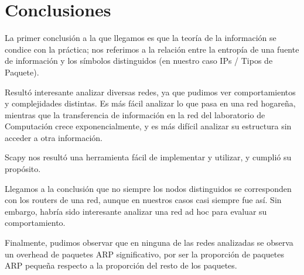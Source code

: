 \section{Conclusiones}

La primer conclusión a la que llegamos es que la teoría de la información se condice con la práctica; nos referimos a la relación entre la entropía de una fuente de información y los símbolos distinguidos (en nuestro caso IPs / Tipos de Paquete).

Resultó interesante analizar diversas redes, ya que pudimos ver comportamientos y complejidades distintas. Es más fácil analizar lo que pasa en una red hogareña, mientras que la transferencia de información en la red del laboratorio de Computación crece exponencialmente, y es más difícil analizar su estructura sin acceder a otra información.

Scapy nos resultó una herramienta fácil de implementar y utilizar, y cumplió su propósito.

Llegamos a la conclusión que no siempre los nodos distinguidos se corresponden con los routers de una red, aunque en nuestros casos casi siempre fue así. Sin embargo, habría sido interesante analizar una red ad hoc para evaluar su comportamiento.

Finalmente, pudimos observar que en ninguna de las redes analizadas se observa un overhead de paquetes ARP significativo, por ser la proporción de paquetes ARP pequeña respecto a la proporción del resto de los paquetes.

